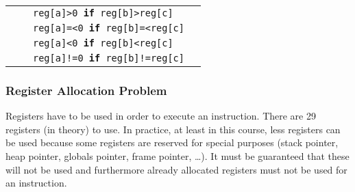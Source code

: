 {\begin{tabular}{llll}
                                &                                       &   \texttt{reg[a]>0 \textbf{if} reg[b]>reg[c]}         \\
                                &                                       &   \texttt{reg[a]=<0 \textbf{if} reg[b]=<reg[c]}       \\
                                &                                       &   \texttt{reg[a]<0 \textbf{if} reg[b]<reg[c]}         \\
                                &                                       &   \texttt{reg[a]!=0 \textbf{if} reg[b]!=reg[c]}       \\
        \hline
    \end{tabular}   
}

\subsubsection*{Register Allocation Problem}

\par{
    \noindent
    Registers have to be used in order to execute an instruction. There are 29 registers (in theory) to use. In practice, at least in this course, less registers can be used because some registers are reserved for special purposes (stack pointer, heap pointer, globals pointer, frame pointer, \ldots). It must be guaranteed that these will not be used and furthermore already allocated registers must not be used for an instruction.
}
\clearpage

